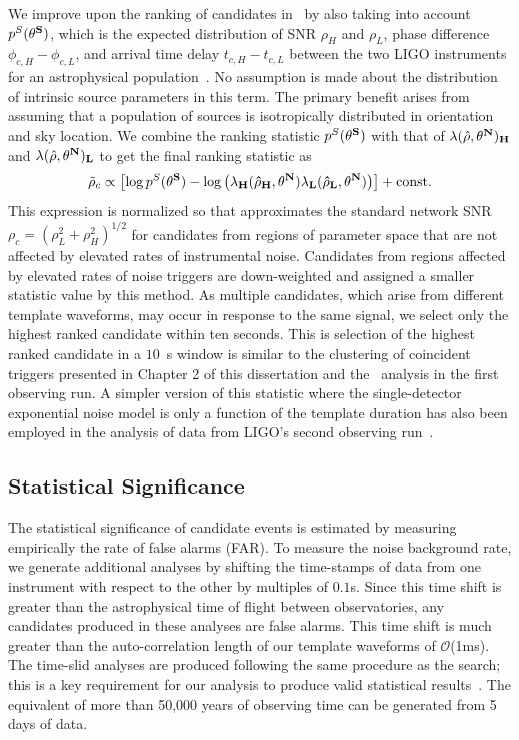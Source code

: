 We improve upon the ranking of candidates in~\cite{Abbott:2016ymx,TheLIGOScientific:2016pea} by also taking into account $p^S(\bf{\theta}^S)$, which is the expected distribution of SNR $\rho_H$ and $\rho_L$, phase difference $\phi_{c, H} - \phi_{c, L}$, and arrival time delay $t_{c,H} - t_{c,L}$ between the two LIGO instruments for an astrophysical population~\citep{Nitz:2017svb}. No assumption is made about the distribution of intrinsic source parameters  in this term. The primary benefit arises from assuming that a population of sources is isotropically distributed in orientation and sky location. We combine the ranking statistic $p^S(\bf{\theta}^S)$ with that of $\lambda(\hat{\rho}, \bf{\theta}^N)_{H}$ and $\lambda(\hat{\rho}, \bf{\theta}^N)_{L}$ to get the final ranking statistic \rankingstat{} as
\begin{equation}\label{eq:genstat}
  \tilde{\rho}_c \propto \left[ \log p^S(\bf{\theta}^S) - \log \left(\lambda_H(\hat{\rho}_{H},\bf{\theta}^N) \lambda_L(\hat{\rho}_{L}, \bf{\theta}^N)\right) 
  \right] + \mathrm{const.}
\end{equation}
This expression is normalized so that \rankingstat{} approximates the standard network SNR $\rho_c = (\rho_L^2 + \rho_H^2)^{1/2}$ for candidates from regions of parameter space that are not affected by elevated rates of instrumental noise. Candidates from regions affected by elevated rates of noise triggers are down-weighted and assigned a smaller statistic value by this method. As multiple candidates, which arise from different template waveforms, may occur in response to the same signal, we select only the highest ranked candidate within ten seconds. This is selection of the highest ranked candidate in a $10$~s window is similar to the clustering of coincident triggers presented in Chapter 2 of this dissertation and the \pycbc{}\ analysis in the first observing run. A simpler version of this statistic where the single-detector exponential noise model is only a function of the template duration has also been employed in the analysis of data from LIGO's second observing run~\citep{GW170104, GW170814, Abbott:2017gyy}.

\subsection{Statistical Significance}

The statistical significance of candidate events is estimated by measuring empirically the rate of false alarms (FAR). To measure the noise background rate, we generate additional analyses by shifting the time-stamps of data from one instrument with respect to the other by multiples of $0.1$s. Since this time shift is greater than the astrophysical time of flight between observatories, any candidates produced in these analyses are false alarms. This time shift is much greater than the auto-correlation length of our template waveforms of $\mathcal{O}$(1ms). The time-slid analyses are produced following the same procedure as the search; this is a key requirement for our analysis to produce valid statistical results~\citep{TheLIGOScientific:2016qqj}. The equivalent of more than 50,000 years of observing time can be generated from 5 days of data.

